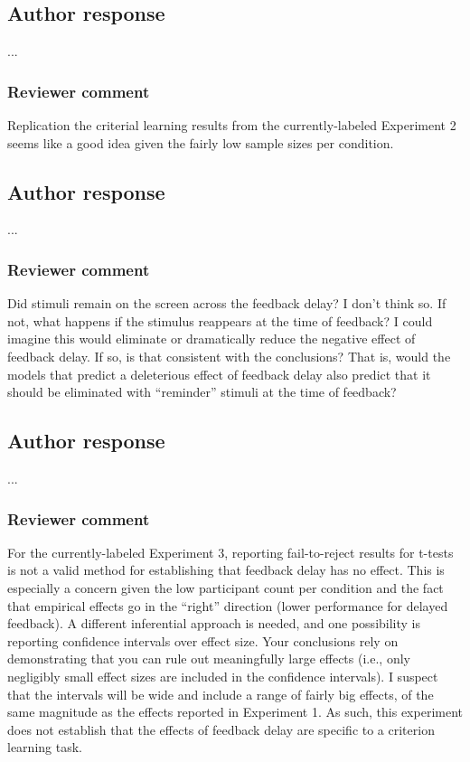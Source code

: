 \documentclass[12pt]{article}
\begin{document}
\subsection{Author response}
...

\subsubsection{Reviewer comment}
Replication the criterial learning results from the
currently-labeled Experiment 2 seems like a good idea given
the fairly low sample sizes per condition.

\subsection{Author response}
...

\subsubsection{Reviewer comment}
Did stimuli remain on the screen across the feedback delay?
I don’t think so. If not, what happens if the stimulus
reappears at the time of feedback? I could imagine this
would eliminate or dramatically reduce the negative effect
of feedback delay. If so, is that consistent with the
conclusions? That is, would the models that predict a
deleterious effect of feedback delay also predict that it
should be eliminated with “reminder” stimuli at the time of
feedback?

\subsection{Author response}
...

\subsubsection{Reviewer comment}
For the currently-labeled Experiment 3, reporting
fail-to-reject results for t-tests is not a valid method for
establishing that feedback delay has no effect. This is
especially a concern given the low participant count per
condition and the fact that empirical effects go in the
“right” direction (lower performance for delayed feedback).
A different inferential approach is needed, and one
possibility is reporting confidence intervals over effect
size. Your conclusions rely on demonstrating that you can
rule out meaningfully large effects (i.e., only negligibly
small effect sizes are included in the confidence
intervals). I suspect that the intervals will be wide and
include a range of fairly big effects, of the same magnitude
as the effects reported in Experiment 1. As such, this
experiment does not establish that the effects of feedback
delay are specific to a criterion learning task.
\end{document}
